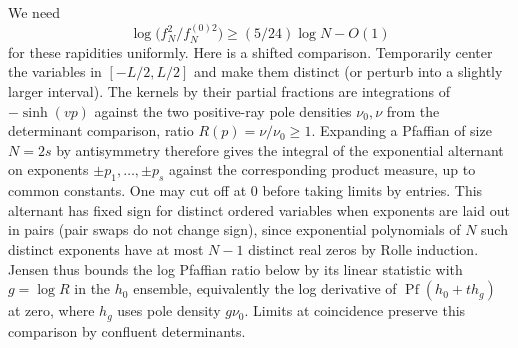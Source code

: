 We need
\begin{equation}
 \log\big(f_N^2/f_N^{(0)2}\big)\ge (5/24)\log N-O(1)
 \label{eq:legacy-P-36}
\end{equation}
for these rapidities uniformly. Here is a shifted comparison. Temporarily center the variables in \([-L/2,L/2]\) and make them distinct (or perturb into a slightly larger interval). The kernels by their partial fractions are integrations of \(-\sinh(vp)\) against the two positive-ray pole densities \(\nu_0,\nu\) from the determinant comparison, ratio \(R(p)=\nu/\nu_0\ge1\). Expanding a Pfaffian of size \(N=2s\) by antisymmetry therefore gives the integral of the exponential alternant on exponents \(\pm p_1,\ldots,\pm p_s\) against the corresponding product measure, up to common constants. One may cut off at 0 before taking limits by entries. This alternant has fixed sign for distinct ordered variables when exponents are laid out in pairs (pair swaps do not change sign), since exponential polynomials of \(N\) such distinct exponents have at most \(N-1\) distinct real zeros by Rolle induction. Jensen thus bounds the log Pfaffian ratio below by its linear statistic with \(g=\log R\) in the \(h_0\) ensemble, equivalently the log derivative of \(\operatorname{Pf}(h_0+t h_g)\) at zero, where \(h_g\) uses pole density \(g\nu_0\). Limits at coincidence preserve this comparison by confluent determinants.



